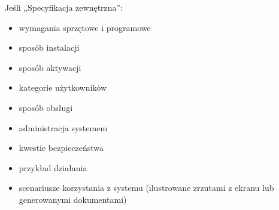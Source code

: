 Jeśli „Specyfikacja zewnętrzna”:
\begin{itemize}
\item  wymagania sprzętowe i programowe
\item  sposób instalacji
\item  sposób aktywacji
\item  kategorie użytkowników
\item  sposób obsługi
\item  administracja systemem
\item  kwestie bezpieczeństwa
\item  przykład działania
\item  scenariusze korzystania z systemu (ilustrowane zrzutami z ekranu lub generowanymi dokumentami)
\end{itemize}

%
%
%
%
%        



